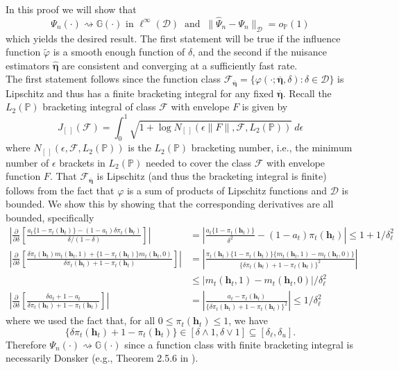 \documentclass[12pt]{article}
\def\indist{\rightsquigarrow}
\newcommand{\Pb}{\mathbb{P}}
\newcommand{\Gb}{\mathbb{G}}
\newcommand{\bh}{\mathbf{h}}
\theoremstyle{remark}
\begin{document}
In this proof we will show that
$$ \Psi_n(\cdot) \indist \Gb(\cdot) \text{ in } \ell^\infty(\mathcal{D})  \ \text{ and } \ \| \widehat\Psi_n - \Psi_n \|_\mathcal{D} = o_\Pb(1)  $$
which yields the desired result. The first statement will be true if the influence function $\widetilde\varphi$ is a smooth enough function of $\delta$, and the second if the nuisance estimators $\hat{\boldsymbol\eta}$ are consistent and converging at a sufficiently fast rate. \\

The first statement follows since the function class $\mathcal{F}_{\boldsymbol{\overline\eta}} = \{\varphi(\cdot; \boldsymbol{\overline\eta}, \delta) : \delta \in \mathcal{D}\}$ is Lipschitz and thus has a finite bracketing integral for any fixed $\boldsymbol{\overline\eta}$. Recall the $L_2(\Pb)$ bracketing integral of class $\mathcal{F}$ with envelope $F$ is given by
$$ J_{[ \ \! ]}(\mathcal{F}) = \int_0^1 \sqrt{ 1+ \log N_{[ \ \! ]}(\epsilon \| F\| , \mathcal{F}, L_2(\Pb))} \ d\epsilon  $$
where $N_{[ \ \! ]}(\epsilon , \mathcal{F}, L_2(\Pb))$ is the $L_2(\Pb)$ bracketing number, i.e., the minimum number of $\epsilon$ brackets in $L_2(\Pb)$ needed to cover the class $\mathcal{F}$ with envelope function $F$. That  $\mathcal{F}_{\boldsymbol{\overline\eta}}$ is Lipschitz (and thus the bracketing integral is finite) follows from the fact that $\varphi$ is a sum of products of Lipschitz functions and $\mathcal{D}$ is bounded.  We show this by showing that the corresponding derivatives are all bounded, specifically
\begin{align*}
\left| \frac{\partial}{\partial \delta} \left[ \frac{a_t \{1-\pi_t(\bh_t)\} - (1-a_t) \delta \pi_t(\bh_t) }{ \delta/(1-\delta)} \right] \right| &= \left| \frac{a_t\{1-\pi_t(\bh_t)\} }{\delta^2} - (1-a_t) \pi_t(\bh_t) \right| \leq 1 + 1/\delta_\ell^2 \\
 \left| \frac{\partial}{\partial \delta} \left[ \frac{ \delta \pi_t(\bh_t) m_t(\bh_t,1) + \{1-\pi_t(\bh_t)\} m_t(\bh_t,0) } { \delta \pi_t(\bh_t) + 1 - \pi_t(\bh_t) } \right] \right| &= \left| \frac{\pi_t(\bh_t) \{1-\pi_t(\bh_t)\} \{m_t(\bh_t,1)-m_t(\bh_t,0)\} }{\{ \delta \pi_t(\bh_t) + 1-\pi_t(\bh_t)\}^2} \right| \\
 &\leq  | m_t(\bh_t, 1) - m_t(\bh_t,0) | / \delta_\ell^2 \\
  \left| \frac{\partial}{\partial \delta} \left[ \frac{ \delta a_t + 1-a_t }{ \delta \pi_t(\bh_t) + 1 - \pi_t(\bh_t) } \right] \right| &= \left| \frac{a_t - \pi_t(\bh_t)}{\{ \delta \pi_t(\bh_t) + 1-\pi_t(\bh_t)\}^2} \right| \leq 1/\delta_\ell^2
\end{align*}
where we used the fact that, for all $0 \leq \pi_t(\bh_t) \leq 1$, we have
$$ \{ \delta \pi_t(\bh_t) + 1-\pi_t(\bh_t)\} \in [ \delta \wedge 1 , \delta \vee 1 ] \subseteq [\delta_\ell, \delta_u] . $$
Therefore $\Psi_n(\cdot) \indist \Gb(\cdot)$ since a function class with finite bracketing integral is necessarily Donsker (e.g., Theorem 2.5.6 in \textcite{van1996weak}).
\end{document}
